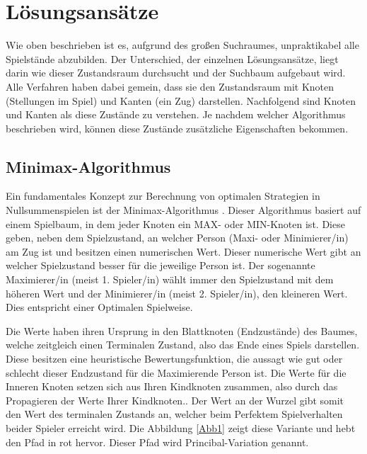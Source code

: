 %

\newpage
\section{Lösungsansätze}
\label{lösung}
Wie oben beschrieben ist es, aufgrund des großen Suchraumes, unpraktikabel alle Spielstände abzubilden. Der Unterschied, der einzelnen Lösungsansätze, liegt darin wie dieser Zustandsraum durchsucht und der Suchbaum aufgebaut wird. Alle Verfahren haben dabei gemein, dass sie den Zustandsraum mit Knoten (Stellungen im Spiel) und Kanten (ein Zug) darstellen. Nachfolgend sind Knoten und Kanten als diese Zustände zu verstehen. Je nachdem welcher Algorithmus beschrieben wird, können diese Zustände zusätzliche Eigenschaften bekommen. 

\subsection{Minimax-Algorithmus}
\label{minimax}
Ein fundamentales Konzept zur Berechnung von optimalen Strategien in Nullsummenspielen ist der Minimax-Algorithmus \cite{Solr-627596169}. Dieser Algorithmus basiert auf einem Spielbaum, in dem jeder Knoten ein MAX- oder MIN-Knoten ist. Diese geben, neben dem Spielzustand, an welcher Person (Maxi- oder Minimierer/in) am Zug ist und besitzen einen numerischen Wert. Dieser numerische Wert gibt an welcher Spielzustand besser für die jeweilige Person ist. Der sogenannte Maximierer/in (meist 1. Spieler/in) wählt immer den Spielzustand mit dem höheren Wert und der Minimierer/in (meist 2. Spieler/in), den kleineren Wert. Dies entspricht einer Optimalen Spielweise.

Die Werte haben ihren Ursprung in den Blattknoten (Endzustände) des Baumes, welche zeitgleich einen Terminalen Zustand, also das Ende eines Spiels darstellen. Diese besitzen eine heuristische Bewertungsfunktion, die aussagt wie gut oder schlecht dieser Endzustand für die Maximierende Person ist. Die Werte für die Inneren Knoten setzen sich aus Ihren Kindknoten zusammen, also durch das Propagieren der Werte Ihrer Kindknoten.. Der Wert an der Wurzel gibt somit den Wert des terminalen Zustands an, welcher beim Perfektem Spielverhalten beider Spieler erreicht wird. Die Abbildung \ref{Abb1} zeigt diese Variante und hebt den Pfad in rot hervor. Dieser Pfad wird Princibal-Variation genannt.


